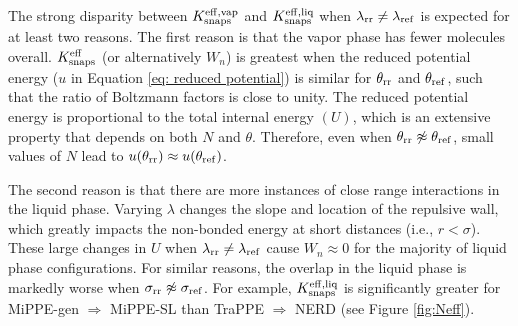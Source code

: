 \documentclass[journal=jced,manuscript=article]{achemso}
\begin{document}
The strong disparity between $K_{\rm snaps}^{\rm eff, vap}$ and $K_{\rm snaps}^{\rm eff, liq}$ when $\lambda_{\rm rr} \neq \lambda_{\rm ref}$ is expected for at least two reasons. The first reason is that the vapor phase has fewer molecules overall. $K_{\rm snaps}^{\rm eff}$ (or alternatively $W_n$) is greatest when the reduced potential energy ($u$ in Equation \ref{eq: reduced potential}) is similar for $\theta_{\rm rr}$ and $\theta_{\rm ref}$, such that the ratio of Boltzmann factors is close to unity. The reduced potential energy is proportional to the total internal energy $(U)$, which is an extensive property that depends on both $N$ and $\theta$. Therefore, even when $\theta_{\rm rr} \not\approx \theta_{\rm ref}$, small values of $N$ lead to $u(\theta_{\rm rr}) \approx u(\theta_{\rm ref})$. 

The second reason is that there are more instances of close range interactions in the liquid phase. Varying $\lambda$ changes the slope and location of the repulsive wall, which greatly impacts the non-bonded energy at short distances (i.e., $r < \sigma$). These large changes in $U$ when $\lambda_{\rm rr} \neq \lambda_{\rm ref}$ cause $W_n \approx 0$ for the majority of liquid phase configurations. For similar reasons, the overlap in the liquid phase is markedly worse when $\sigma_{\rm rr} \not\approx \sigma_{\rm ref}$. For example, $K_{\rm snaps}^{\rm eff, liq}$ is significantly greater for MiPPE-gen $\Rightarrow$ MiPPE-SL than TraPPE $\Rightarrow$ NERD (see Figure \ref{fig:Neff}). 




\end{document}
